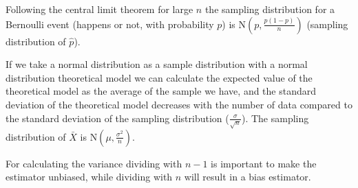 Following the central limit theorem for large $n$ the sampling distribution for
a Bernoulli event (happens or not, with probability $p$) is N$\left( p,
	\frac{p(1-p)}{n}\right)$ (sampling distribution of $\hat{p}$).

If we take a normal distribution as a sample distribution with a normal
distribution theoretical model we can calculate the expected value of the
theoretical model as the average of the sample we have, and the standard
deviation of the theoretical model decreases with the number of data compared
to the standard deviation of the sampling distribution
($\frac{\sigma}{\sqrt{n}}$). The sampling distribution of $\bar{X}$ is N$\left(
	\mu, \frac{\sigma^2}{n}\right)$.

For calculating the variance dividing with $n-1$ is important to make the
estimator unbiased, while dividing with $n$ will result in a bias estimator.
